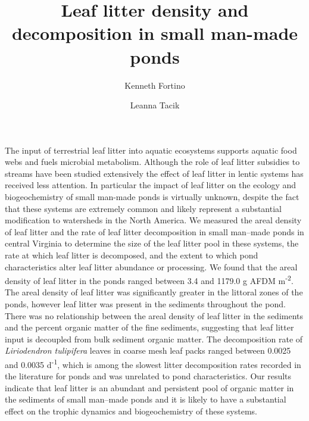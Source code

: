 \documentclass{article}
\renewenvironment{abstract}
  {{\bfseries\noindent{\large\abstractname}\par\nobreak}}
  {}
\begin{document}
\title{Leaf litter density and decomposition in small man-made ponds}


\author[ ]{Kenneth Fortino}
\author[ ]{Leanna Tacik}

\affil[ ]{}
\vspace{-1em}


\date{}

\begingroup
\let\center\flushleft
\let\endcenter\endflushleft
\maketitle
\endgroup

\doublespacing
\linenumbers

\begin{abstract}
The input of terrestrial leaf litter into aquatic ecosystems supports aquatic food webs and fuels microbial metabolism. Although the role of leaf litter subsidies to streams have been studied extensively the effect of leaf litter in lentic systems has received less attention.  In particular the impact of leaf litter on the ecology and biogeochemistry of small man-made ponds is virtually unknown, despite the fact that these systems are extremely common and likely represent a substantial modification to watersheds in the North America. We measured the areal density of leaf litter and the rate of leaf litter decomposition in small man--made ponds in central Virginia to determine the size of the leaf litter pool in these systems, the rate at which leaf litter is decomposed, and the extent to which pond characteristics alter leaf litter abundance or processing.  We found that the areal density of leaf litter in the ponds ranged between 3.4 and 1179.0 g AFDM m\textsuperscript{-2}. The areal density of leaf litter was significantly greater in the littoral zones of the ponds, however leaf litter was present in the sediments throughout the pond. There was no relationship between the areal density of leaf litter in the sediments and the percent organic matter of the fine sediments, suggesting that leaf litter input is decoupled from bulk sediment organic matter. The decomposition rate of \emph{Liriodendron tulipifera} leaves in coarse mesh leaf packs ranged between 0.0025 and 0.0035 d\textsuperscript{-1}, which is among the slowest litter decomposition rates recorded in the literature for ponds and was unrelated to pond characteristics. Our results indicate that leaf litter is an abundant and persistent pool of organic matter in the sediments of small man--made ponds and it is likely to have a substantial effect on the trophic dynamics and biogeochemistry of these systems.%
\end{abstract}%
\end{document}
